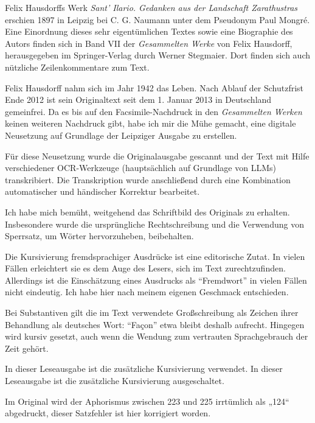 \EditorialNotes

Felix Hausdorffs Werk \emph{Sant' Ilario. Gedanken aus der Landschaft Zarathustras}
erschien 1897 in Leipzig bei C. G. Naumann unter dem Pseudonym Paul Mongré.
Eine Einordnung dieses sehr eigentümlichen Textes sowie eine Biographie des Autors
finden sich in Band VII der \emph{Gesammelten Werke} von Felix Hausdorff, herausgegeben im Springer-Verlag durch Werner Stegmaier.
Dort finden sich auch nützliche Zeilenkommentare zum Text.

Felix Hausdorff nahm sich im Jahr 1942 das Leben.
Nach Ablauf der Schutzfrist Ende 2012 ist sein Originaltext seit dem 1. Januar 2013 in Deutschland gemeinfrei.
Da es bis auf den Facsimile-Nachdruck in den \emph{Gesammelten Werken} keinen weiteren Nachdruck gibt, habe ich mir die Mühe gemacht,
eine digitale Neusetzung auf Grundlage der Leipziger Ausgabe zu erstellen.

Für diese Neusetzung wurde die Originalausgabe gescannt und der Text mit Hilfe verschiedener OCR-Werkzeuge (hauptsächlich auf Grundlage von LLMs) transkribiert.
Die Transkription wurde anschließend durch eine Kombination automatischer und händischer Korrektur bearbeitet.

Ich habe mich bemüht, weitgehend das Schriftbild des Originals zu erhalten.
Insbesondere wurde die ursprüngliche Rechtschreibung und die Verwendung von Sperrsatz,
um Wörter hervorzuheben, beibehalten.

Die Kursivierung fremdsprachiger Ausdrücke ist eine editorische Zutat.
In vielen Fällen erleichtert sie es dem Auge des Lesers, sich im Text zurechtzufinden.
Allerdings ist die Einschätzung eines Ausdrucks als ``Fremdwort'' in vielen Fällen nicht eindeutig.
Ich habe hier nach meinem eigenen Geschmack entschieden.
\par
Bei Substantiven gilt die im Text verwendete Großschreibung als
Zeichen ihrer Behandlung als deutsches Wort: ``Façon'' etwa bleibt deshalb
aufrecht. Hingegen wird 
kursiv gesetzt, auch wenn die Wendung zum vertrauten Sprachgebrauch
der Zeit gehört.
\par
\ifEditorialItalics
In dieser Leseausgabe ist die zusätzliche Kursivierung verwendet.
\else
In dieser Leseausgabe ist die zusätzliche Kursivierung ausgeschaltet.
\fi
\par

Im Original wird der Aphorismus zwischen 223 und 225 irrtümlich als „124“ abgedruckt,
dieser Satzfehler ist hier korrigiert worden.
\par

